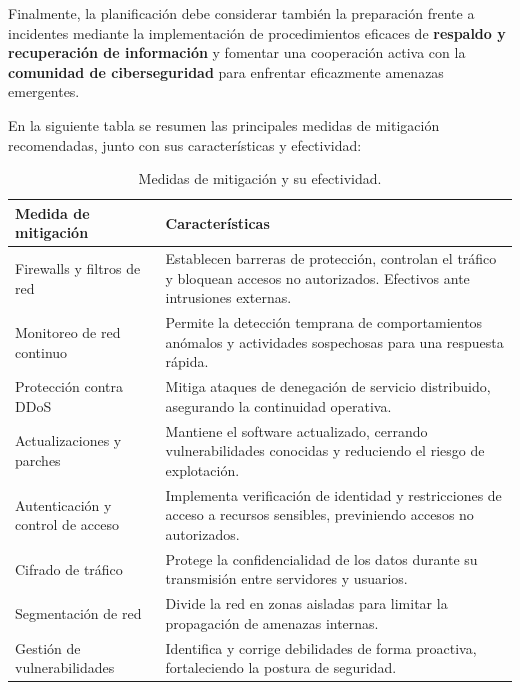 \documentclass[a4paper, 11pt]{article}
\begin{document}
Finalmente, la planificación debe considerar también la preparación frente a incidentes mediante la implementación de procedimientos eficaces de \textbf{respaldo y recuperación de información} y fomentar una cooperación activa con la \textbf{comunidad de ciberseguridad} para enfrentar eficazmente amenazas emergentes.
\par\vspace{0.5cm}

En la siguiente tabla se resumen las principales medidas de mitigación recomendadas, junto con sus características y efectividad:
\par\vspace{0.5cm}

\begin{table}[H]
    \centering
    \caption{Medidas de mitigación y su efectividad.}
    \begin{tabular}{p{4.5cm} p{10cm}}
    \toprule
    \textbf{Medida de mitigación} & \textbf{Características} \\
    \hline
    Firewalls y filtros de red & Establecen barreras de protección, controlan el tráfico y bloquean accesos no autorizados. Efectivos ante intrusiones externas. \\
    \bottomrule
    Monitoreo de red continuo & Permite la detección temprana de comportamientos anómalos y actividades sospechosas para una respuesta rápida. \\
    \bottomrule
    Protección contra DDoS & Mitiga ataques de denegación de servicio distribuido, asegurando la continuidad operativa. \\
    \bottomrule
    Actualizaciones y parches & Mantiene el software actualizado, cerrando vulnerabilidades conocidas y reduciendo el riesgo de explotación. \\
    \bottomrule
    Autenticación y control de acceso & Implementa verificación de identidad y restricciones de acceso a recursos sensibles, previniendo accesos no autorizados. \\
    \bottomrule
    Cifrado de tráfico & Protege la confidencialidad de los datos durante su transmisión entre servidores y usuarios. \\
    \bottomrule
    Segmentación de red & Divide la red en zonas aisladas para limitar la propagación de amenazas internas. \\
    \bottomrule
    Gestión de vulnerabilidades & Identifica y corrige debilidades de forma proactiva, fortaleciendo la postura de seguridad. \\
    \bottomrule

\end{tabular}
\end{table}
\end{document}
